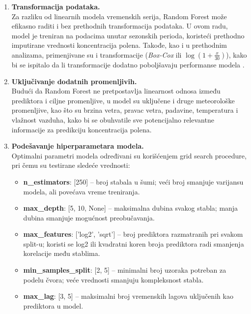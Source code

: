 \documentclass[12pt]{article}
\begin{document}
\begin{enumerate}
    \item \textbf{Transformacija podataka.} \\
    Za razliku od linearnih modela vremenskih serija, Random Forest može efikasno raditi i bez prethodnih transformacija podataka. U ovom radu, model je treniran na podacima unutar sezonskih perioda, koristeći prethodno imputirane vrednosti koncentracija polena. Takođe, kao i u prethodnim analizama, primenjivane su i transformacije (\textit{Box-Cox} ili $\log(1 + \frac{x}{30})$), kako bi se ispitalo da li transformacije dodatno poboljšavaju performanse modela \cite{boxcox1964}.

    \item \textbf{Uključivanje dodatnih promenljivih.} \\
    Budući da Random Forest ne pretpostavlja linearnost odnosa između prediktora i ciljne promenljive, u model su uključene i druge meteorološke promenljive, kao što su brzina vetra, pravac vetra, padavine, temperatura i vlažnost vazduha, kako bi se obuhvatile sve potencijalno relevantne informacije za predikciju koncentracija polena.

    \item \textbf{Podešavanje hiperparametara modela.} \\
    Optimalni parametri modela određivani su korišćenjem grid search procedure, pri čemu su testirane sledeće vrednosti:
    \begin{itemize}
        \item \textbf{n\_estimators}: [250] – broj stabala u šumi; veći broj smanjuje varijansu modela, ali povećava vreme treniranja.
        \item \textbf{max\_depth}: [5, 10, None] – maksimalna dubina svakog stabla; manja dubina smanjuje mogućnost preobučavanja.
        \item \textbf{max\_features}: ['log2', 'sqrt'] – broj prediktora razmatranih pri svakom split-u; koristi se log2 ili kvadratni koren broja prediktora radi smanjenja korelacije među stablima.
        \item \textbf{min\_samples\_split}: [2, 5] – minimalni broj uzoraka potreban za podelu čvora; veće vrednosti smanjuju kompleksnost stabla.
        \item \textbf{max\_lag}: [3, 5] – maksimalni broj vremenskih lagova uključenih kao prediktora u model.
    \end{itemize}


\end{enumerate}
\end{document}
